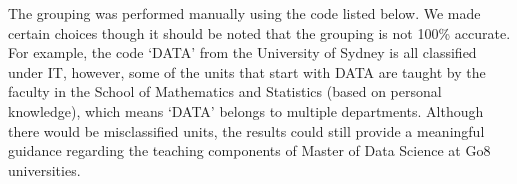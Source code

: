 \documentclass[
  letterpaper,
]{report}
\begin{document}
\begin{table}
\centering
{}
\end{table}

The grouping was performed manually using the code listed below. We made
certain choices though it should be noted that the grouping is not 100\%
accurate. For example, the code `DATA' from the University of Sydney is
all classified under IT, however, some of the units that start with DATA
are taught by the faculty in the School of Mathematics and Statistics
(based on personal knowledge), which means `DATA' belongs to multiple
departments. Although there would be misclassified units, the results
could still provide a meaningful guidance regarding the teaching
components of Master of Data Science at Go8 universities.
\end{document}
